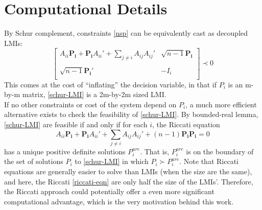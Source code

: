 \documentclass{article}
\begin{document}
\section{Computational Details} %
\label{sec:computational_consideration}

By Schur complement, constraints \eqref{nsp} can be equivalently cast as decoupled LMIs:
\begin{equation}\label{schur-LMI}
\begin{bmatrix}
   A_{ii}\pmb{P_{i}}+\pmb{P_{i}}A_{ii}'+\sum\limits_{j\neq i}A_{ij}A_{ij}'& \sqrt{n-1}\pmb{P_{i}}\\
   \\
\sqrt{n-1}\pmb{P_{i}}' &-I_i\\
\end{bmatrix}
\prec 0
\end{equation}
This comes at the cost of ``inflating'' the decision variable, in that if $P_i$ is an m-by-m matrix, \eqref{schur-LMI} is a 2m-by-2m sized LMI.\\

If no other constraints or cost of the system depend on $P_i$, a much more efficient alternative exists to check the feasibility of \eqref{schur-LMI}. By bounded-real lemma, \eqref{schur-LMI} are feasible if and only if for each $i$, the Riccati equation
\begin{equation}\label{riccati-eqn}
A_{ii}\pmb{P_i}+\pmb{P_i}A_{ii}'+\sum\limits_{j \neq i}\pmb{}A_{ij}A_{ij}'+(n-1)\pmb{P_i}\pmb{P_i}=0
\end{equation} has a unique positive definite solutions $P_{i}^{are}$. That is, $P_{i}^{are}$ is on the boundary of the set of solutions $P_i$ to \eqref{schur-LMI} in which $P_i\succ P_{i}^{are}$. Note that Riccati equations are generally easier to solve than LMIs (when the size are the same), and here, the Riccati \eqref{riccati-eqn} are only half the size of the LMIs'. Therefore, the Riccati approach could potentially offer a even more significant computational advantage, which is the very motivation behind this work.\\

\end{document}
